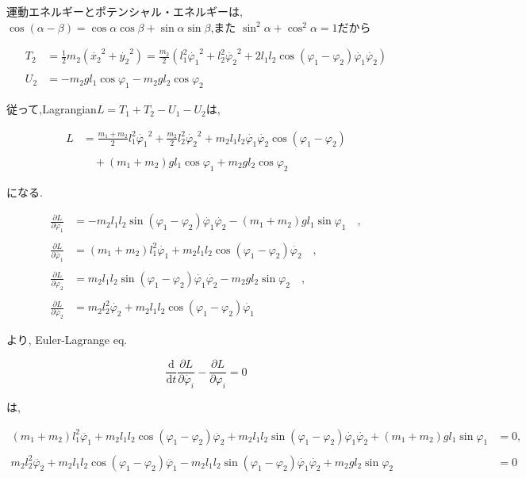 運動エネルギーとポテンシャル・エネルギーは,\\
$\cos(\alpha-\beta)=\cos\alpha\cos\beta+\sin\alpha\sin\beta$,また $\sin^2\alpha+\cos^2\alpha=1$だから

\begin{align*}
\displaystyle T_2&=\frac{1}{2}m_2(\dot{x_2}^2+\dot{y_2}^2)=\frac{m_2}{2}\left(l_1^2\dot{\varphi_1}^2+l_2^2\dot{\varphi_2}^2+2l_1l_2\cos(\varphi_1-\varphi_2)\dot{\varphi_1}\dot{\varphi_2}\right)\\\\
U_2&=-m_2gl_1\cos\varphi_1-m_2gl_2\cos\varphi_2
\end{align*}

従って,Lagrangian$L=T_1+T_2-U_1-U_2$は,

\begin{align*}
L&=\displaystyle\frac{m_1+m_2}{2}l_1^2\dot{\varphi_1}^2+\frac{m_2}{2}l_2^2\dot{\varphi_2}^2+m_2l_1l_2\dot{\varphi_1}\dot{\varphi_2}\cos(\varphi_1-\varphi_2)\\\\
&\quad+(m_1+m_2)gl_1\cos\varphi_1+m_2gl_2\cos\varphi_2
\end{align*}

になる. 

\begin{align*}
\displaystyle\frac{\partial L}{\partial\varphi_1}&=-m_2l_1l_2\sin(\varphi_1-\varphi_2)\dot{\varphi_1}\dot{\varphi_2}-(m_1+m_2)gl_1\sin\varphi_1\quad,\\\\
\displaystyle\frac{\partial L}{\partial\dot{\varphi_1}}&=(m_1+m_2)l_1^2\dot{\varphi_1}+m_2l_1l_2\cos(\varphi_1-\varphi_2)\dot{\varphi_2}\quad,\\\\
\displaystyle\frac{\partial L}{\partial\varphi_2}&=m_2l_1l_2\sin(\varphi_1-\varphi_2)\dot{\varphi_1}\dot{\varphi_2}-m_2gl_2\sin\varphi_2\quad,\\\\
\displaystyle\frac{\partial L}{\partial\dot{\varphi_2}}&=m_2l_2^2\dot{\varphi_2}+m_2l_1l_2\cos(\varphi_1-\varphi_2)\dot{\varphi_1}
\end{align*}

より, Euler-Lagrange eq.

\[
\displaystyle \frac{\mathrm{d}}{\mathrm{d}t}\frac{\partial L}{\partial \dot{\varphi_i}}-\frac{\partial L}{\partial \varphi_i}=0
\]

は,

\begin{align*}
(m_1+m_2)l_1^2\ddot{\varphi_1}+m_2l_1l_2\cos(\varphi_1-\varphi_2)\ddot{\varphi_2}+m_2l_1l_2\sin(\varphi_1-\varphi_2)\dot{\varphi_1}\dot{\varphi_2}+(m_1+m_2)gl_1\sin\varphi_1&=0,\\\\
m_2l_2^2\ddot{\varphi_2}+m_2l_1l_2\cos(\varphi_1-\varphi_2)\ddot{\varphi_1}-m_2l_1l_2\sin(\varphi_1-\varphi_2)\dot{\varphi_1}\dot{\varphi_2}+m_2gl_2\sin\varphi_2&=0
\end{align*}

